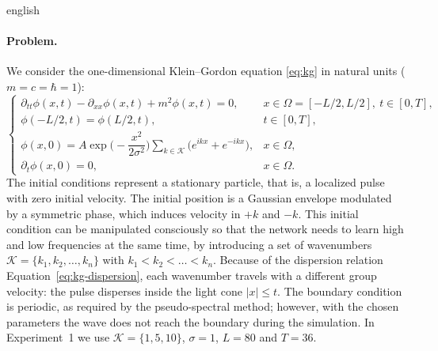 \documentclass[11pt,letterpaper,twoside,openright]{book} %
\newcommand{\abs}[1]{\left\lvert #1 \right\rvert}
\newif\ifreviewmode
\newcommand{\revtag}[2]{\ifreviewmode{\color{red!70!black}\textsf{\footnotesize[#1#2]}}\fi}
\newcommand{\verificar}[1]{\revtag{VERIFICAR}{: #1}}
\begin{document}
\begin{hyphenrules}{english}
\paragraph{Problem.}
We consider the one-dimensional Klein--Gordon equation \eqref{eq:kg} in natural units ($m=c=\hbar=1$):
\begin{equation}
  \begin{cases}
    \partial_{tt}\phi(x,t)-\partial_{xx}\phi(x,t)+m^2\phi(x,t)=0, & x\in\Omega=[-L/2,L/2],\ t\in[0,T],\\
    \phi(-L/2,t)=\phi(L/2,t), & t\in[0,T],\\
    \phi(x,0)=A\exp\Big(-\dfrac{x^2}{2\sigma^2}\Big)\displaystyle\sum_{k\in\mathcal{K}}\big(e^{ikx}+e^{-ikx}\big), & x\in\Omega,\\
    \partial_t\phi(x,0)=0, & x\in\Omega.
  \end{cases}
  \label{eq:kg-problem}
\end{equation}
The initial conditions represent a stationary particle, that is, a localized pulse with zero initial
velocity. The initial position is a Gaussian envelope modulated by a symmetric phase, which induces
velocity in $+k$ and $-k$. This initial condition can be manipulated consciously so that the network
needs to learn high and low frequencies at the same time, by introducing a set of wavenumbers
$\mathcal{K}=\{k_1,k_2,\dots,k_n\}$ with $k_1<k_2<\dots<k_n$. Because of the dispersion relation
Equation~\eqref{eq:kg-dispersion}, each wavenumber travels with a different group velocity: the pulse disperses
inside the light cone $\abs{x}\le t$. The boundary condition is periodic, as required by the
pseudo-spectral method; however, with the chosen parameters the wave does not reach the boundary during
the simulation. In Experiment~1 we use $\mathcal{K}=\{1,5,10\}$, $\sigma=1$, $L=80$ and $T=36$.
\verificar{value of the amplitude $A$; the presentation writes $\Omega=[-L,L]$ but the figures show
$x\in[-40,40]$}


\end{hyphenrules}
\end{document}
